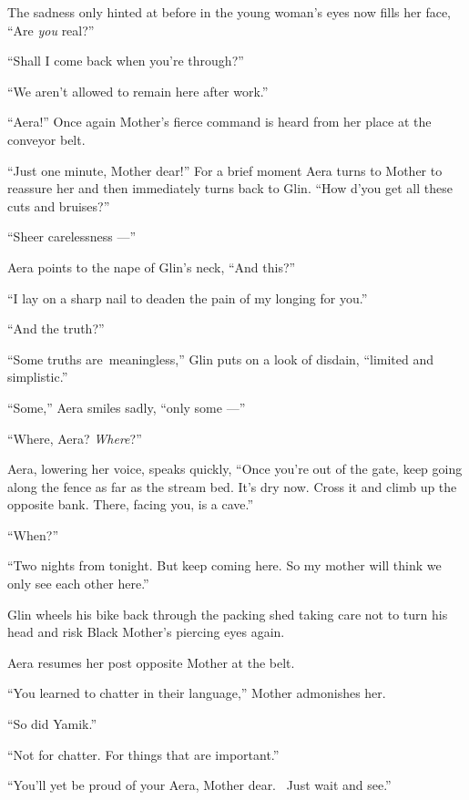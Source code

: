 \documentclass[twoside,11pt,openany]{book}
\begin{document}
The sadness only hinted at before in the young woman's eyes now fills her face, ``Are \textit{you}
real?''

``Shall I come back when you're through?''

``We aren't allowed to remain here after work.''

``Aera!'' Once again Mother's fierce command is heard from her place at the conveyor belt.

``Just one minute, Mother dear!'' For a brief moment\MakeUppercase{ a}era turns to Mother to
reassure her and then immediately turns back to Glin. ``How d'you get all these cuts and
bruises?''

``Sheer carelessness ---''

Aera points to the nape of Glin's neck, ``And this?''

``I lay on a sharp nail to deaden the pain of my longing for you.''

``And the truth?''

``Some truths are~meaningless,'' Glin puts on a look of disdain, ``limited and
simplistic.''

``Some,'' Aera smiles sadly, ``only some ---''

``Where, Aera? \textit{Where}?''

Aera, lowering her voice, speaks quickly, ``Once you're out of the gate, keep going along the fence as far
as the stream bed. It's dry now. Cross it and climb up the opposite bank. There, facing you, is a
cave.''

``When?''

``Two nights from tonight. But keep coming here. So my mother will think we only see each other
here.''

Glin wheels his bike back through the packing shed taking care not to turn his head and risk Black Mother's piercing
eyes again.

Aera resumes her post opposite Mother at the belt.

``You learned to chatter in their language,'' Mother admonishes her.

``So did Yamik.''

``Not for chatter. For things that are important.''

``You'll yet be proud of your Aera, Mother dear.~ Just wait and see.''



\chapter{}
\end{document}
